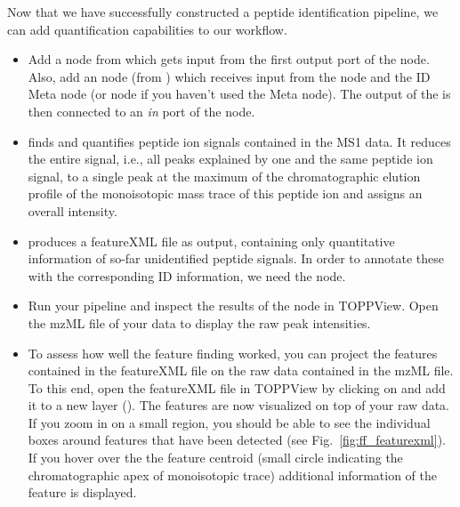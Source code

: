Now that we have successfully constructed a peptide identification pipeline, we can add quantification capabilities to our workflow.

\begin{itemize}
\item
Add a  node from  which gets input from the first output port of the  node. Also, add an  node (from ) which receives input from the  node and the ID Meta node (or  node if you haven't used the Meta node).
The output of the  is then connected to an \textit{in} port of the  node.
\item
{} finds and quantifies peptide ion signals contained in the MS1 data.
It reduces the entire signal, i.e., all peaks explained by one and the same peptide ion signal, to a single peak at the maximum of the chromatographic elution profile of the monoisotopic mass trace of this peptide ion and assigns an overall intensity.
\item
{} produces a featureXML file as output, containing only quantitative information of so-far unidentified peptide signals.
In order to annotate these with the corresponding ID information, we need the  node.
\item Run your pipeline and inspect the results of the  node in TOPPView. Open the mzML file of your data to display the raw peak intensities.
\item To assess how well the feature finding worked, you can project the features contained in the featureXML file on the raw data contained in the mzML file. To this end, open the featureXML file in TOPPView by clicking on  and add it to a new layer (). The features are now visualized on top of your raw data. If you zoom in on a small region, you should be able to see the individual boxes around features that have been detected (see Fig.~\ref{fig:ff_featurexml}). If you hover over the the feature centroid (small circle indicating the chromatographic apex of monoisotopic trace) additional information of the feature is displayed.


\end{itemize}
